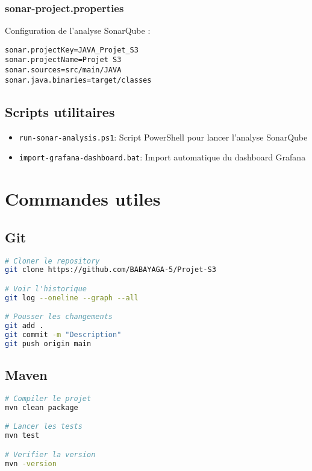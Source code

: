 \documentclass[12pt,a4paper]{article}
\begin{document}
\subsubsection{sonar-project.properties}
Configuration de l'analyse SonarQube :
\begin{lstlisting}
sonar.projectKey=JAVA_Projet_S3
sonar.projectName=Projet S3
sonar.sources=src/main/JAVA
sonar.java.binaries=target/classes
\end{lstlisting}

\subsection{Scripts utilitaires}

\begin{itemize}
    \item \texttt{run-sonar-analysis.ps1}: Script PowerShell pour lancer l'analyse SonarQube
    \item \texttt{import-grafana-dashboard.bat}: Import automatique du dashboard Grafana
\end{itemize}

\newpage

\section{Commandes utiles}

\subsection{Git}
\begin{lstlisting}[language=bash]
# Cloner le repository
git clone https://github.com/BABAYAGA-5/Projet-S3

# Voir l'historique
git log --oneline --graph --all

# Pousser les changements
git add .
git commit -m "Description"
git push origin main
\end{lstlisting}

\subsection{Maven}
\begin{lstlisting}[language=bash]
# Compiler le projet
mvn clean package

# Lancer les tests
mvn test

# Verifier la version
mvn -version
\end{lstlisting}
\end{document}
